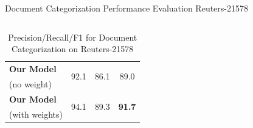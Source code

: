 \documentclass[10pt]{beamer}
\newcommand{\highest}[1]{\textbf{#1}}
\begin{document}
\begin{frame}{Document Categorization Performance Evaluation Reuters-21578 }
\begin{columns}[T]
\begin{column}{.4\textwidth}
\begin{table}[h!]
\begin{center}
\begin{tabular}{l@{\hskip8mm} c c@{\hskip4mm} c}
		\addlinespace[1mm]
		\textbf{Our Model}
		& \multirow{2}{*}{92.1}   & \multirow{2}{*}{86.1}  & \multirow{2}{*}{89.0} \\
		(no weight) & & & \\ \addlinespace[1mm]
		\textbf{Our Model}
		& \multirow{2}{*}{94.1}   & \multirow{2}{*}{89.3}  & \multirow{2}{*}{\highest{91.7}} \\
		(with weights) & & & \\
		\bottomrule         
		\end{tabular}
		\caption*{\footnotesize Precision/Recall/F1 for Document Categorization on Reuters-21578 }
		\end{center}
		\end{table}
	\end{column}
\end{columns}

\end{frame}
\end{document}
